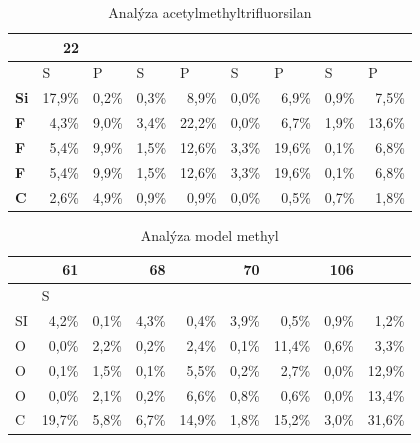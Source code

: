 \documentclass[
  digital, %
  table,   %
  lof,     %
  lot,     %
  oneside,
]{fithesis3}
\begin{document}
\begin{table}[htbp]
\caption{Analýza acetylmethyltrifluorsilan}
\begin{center}
\begin{tabular}{|l|r|r|r|r|r|r|r|r|}
\hline
 & 22 &  \\ \hline
 & \multicolumn{1}{l|}{S} & \multicolumn{1}{l|}{P} & \multicolumn{1}{l|}{S} & \multicolumn{1}{l|}{P} & \multicolumn{1}{l|}{S} & \multicolumn{1}{l|}{P} & \multicolumn{1}{l|}{S} & \multicolumn{1}{l|}{P} \\ \hline
\textbf{Si} & 17,9\% & 0,2\% & 0,3\% & 8,9\% & 0,0\% & 6,9\% & 0,9\% & 7,5\% \\ \hline
\textbf{F} & 4,3\% & 9,0\% & 3,4\% & 22,2\% & 0,0\% & 6,7\% & 1,9\% & 13,6\% \\ \hline
\textbf{F} & 5,4\% & 9,9\% & 1,5\% & 12,6\% & 3,3\% & 19,6\% & 0,1\% & 6,8\% \\ \hline
\textbf{F} & 5,4\% & 9,9\% & 1,5\% & 12,6\% & 3,3\% & 19,6\% & 0,1\% & 6,8\% \\ \hline
\textbf{C} & 2,6\% & 4,9\% & 0,9\% & 0,9\% & 0,0\% & 0,5\% & 0,7\% & 1,8\% \\ \hline
\end{tabular}
\end{center}
\label{acetylmethyltrifluorsilan_MPA}
\end{table}

\begin{table}[htbp]
\caption{Analýza model methyl}
\begin{center}
\begin{tabular}{|l|r|r|r|r|r|r|r|r|}
\hline
 & 61 & \multicolumn{1}{l|}{} & 68 & \multicolumn{1}{l|}{} & 70 & \multicolumn{1}{l|}{} & 106 & \multicolumn{1}{l|}{} \\ \hline
 & \multicolumn{1}{l|}{S} &  \\
SI  & 4,2\% & 0,1\% & 4,3\% & 0,4\% & 3,9\% & 0,5\% & 0,9\% & 1,2\% \\ \hline
O & 0,0\% & 2,2\% & 0,2\% & 2,4\% & 0,1\% & 11,4\% & 0,6\% & 3,3\% \\ \hline
O & 0,1\% & 1,5\% & 0,1\% & 5,5\% & 0,2\% & 2,7\% & 0,0\% & 12,9\% \\ \hline
O & 0,0\% & 2,1\% & 0,2\% & 6,6\% & 0,8\% & 0,6\% & 0,0\% & 13,4\% \\ \hline
C & 19,7\% & 5,8\% & 6,7\% & 14,9\% & 1,8\% & 15,2\% & 3,0\% & 31,6\% \\ \hline
\end{tabular}
\end{center}
\label{si_model_methyl_MPA}
\end{table}
\end{document}

